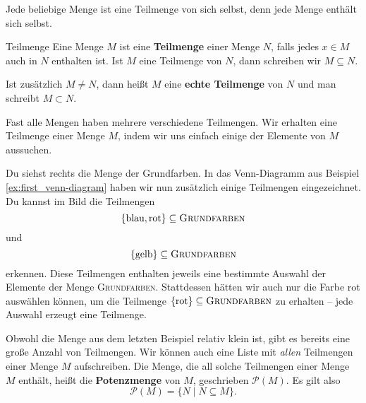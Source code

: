 \documentclass[../../main.tex]{subfiles}
\begin{document}
\begin{example}{}
    Jede beliebige Menge ist eine Teilmenge von sich selbst, denn jede Menge enthält sich selbst.
\end{example}

\begin{definition}{Teilmenge}
    Eine Menge $M$ ist eine \textbf{Teilmenge} einer Menge $N$, falls jedes $x\in M$ auch in $N$ enthalten ist. Ist $M$ eine Teilmenge von $N$, dann schreiben wir $M\subseteq N$.

    Ist zusätzlich $M\neq N$, dann heißt $M$ eine \textbf{echte Teilmenge} von $N$ und man schreibt $M\subset N$.
\end{definition}

Fast alle Mengen haben mehrere verschiedene Teilmengen. Wir erhalten eine Teilmenge einer Menge $M$, indem wir uns einfach einige der Elemente von $M$ aussuchen.

\begin{example}{}
    Du siehst rechts die Menge der Grundfarben. In das Venn-Diagramm aus Beispiel \ref{ex:first_venn-diagram} haben wir nun zusätzlich einige Teilmengen eingezeichnet. Du kannst im Bild die Teilmengen
    \[\{\text{blau},\text{rot}\}\subseteq\textsc{Grundfarben}\]
    und
    \[\{\text{gelb}\}\subseteq\textsc{Grundfarben}\]
    erkennen. Diese Teilmengen enthalten jeweils eine bestimmte Auswahl der Elemente der Menge \textsc{Grundfarben}. Stattdessen hätten wir auch nur die Farbe rot auswählen können, um die Teilmenge $\{\text{rot}\}\subseteq\textsc{Grundfarben}$ zu erhalten -- jede Auswahl erzeugt eine Teilmenge.
\end{example}

Obwohl die Menge aus dem letzten Beispiel relativ klein ist, gibt es bereits eine große Anzahl von Teilmengen. Wir können auch eine Liste mit \emph{allen} Teilmengen einer Menge $M$ aufschreiben. Die Menge, die all solche Teilmengen einer Menge $M$ enthält, heißt die \textbf{Potenzmenge} von $M$, geschrieben $\mathcal{P}(M)$. Es gilt also
\[\mathcal{P}(M)=\{N\mid N\subseteq M\}.\]
\end{document}
